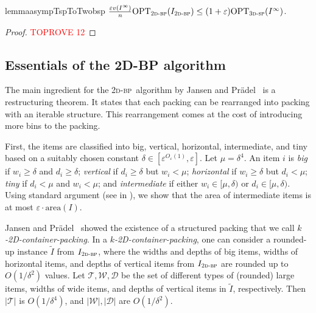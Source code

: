 \documentclass[a4paper,UKenglish,cleveref, autoref, thm-restate]{lipics-v2021}
\newcommand{\eps}{\varepsilon}
\newcommand{\opt}{\mathrm{OPT}}
\newcommand{\twobp}{\textsc{2d-bp}\xspace}
\newcommand{\tsp}{\textsc{3d-sp}\xspace}
\newcommand{\inter}{intermediate\xspace}
\newcommand{\bigy}{big\xspace}
\newcommand{\tin}{tiny\xspace}
\newcommand{\area}{\mathrm{area}}
\begin{document}
\begin{restatable}{lemma}{asympTspToTwobsp}
\label{lem:asymp-tsp-to-twobsp}
$\frac{\eps v(I^{\infty})}{ n} \opt_{\twobp}(I_{\twobp})\leq (1+\eps)\opt_{\tsp}(I^{\infty})$.
\end{restatable}

\begin{proof}\textcolor{red}{TOPROVE 12}\end{proof}

\subsection{Essentials of the 2D-BP algorithm}
\label{subsec:2dbp}

The main ingredient for the \twobp~algorithm by Jansen and Prädel~\cite{jansen2016new} is a restructuring theorem.
It states that each packing can be rearranged into packing with an iterable structure. This rearrangement comes at the cost of introducing more bins to the packing.

First, the items are classified into \bigy, vertical, horizontal, \inter, and  \tin based on a suitably chosen constant $\delta \in [\eps^{O_{\eps}(1)}, \eps]$.
Let $\mu = \delta^4$.
An item $i$ is {\em \bigy} if $w_i \geq \delta$ and $d_i \geq \delta$; {\em vertical} if $d_i \geq \delta$ but $w_i < \mu$; {\em horizontal} if $w_i \geq \delta$ but $d_i < \mu$; {\em \tin} if $d_i < \mu$ and $w_i < \mu$; and {\em \inter} if either $w_i \in [\mu,\delta)$ or $d_i \in [\mu,\delta)$.
Using standard argument (see  in ), we show that the area of \inter items is at most $\eps \cdot \area(I)$. 



Jansen and Prädel~\cite{jansen2016new} showed the existence of a structured packing that we call \emph{$k$-2D-container-packing}.
In a \emph{$k$-2D-container-packing}, one can consider a rounded-up instance $\tilde{I}$ from $I_{\twobp}$, where the widths and depths of \bigy items, widths of horizontal items, and depths of vertical items from $I_{\twobp}$ are rounded up to $O(1/\delta^2)$ values.
Let $\mathcal{T}, \mathcal{W}, \mathcal{D}$ be the set of different types of (rounded) large items, widths of wide items, and depths of vertical items in $\tilde{I}$, respectively. 
Then $|\mathcal{T}|$ is $O(1/\delta^4)$, and $|\mathcal{W}|, |\mathcal{D}|$ are $O(1/\delta^2)$. 
\end{document}

